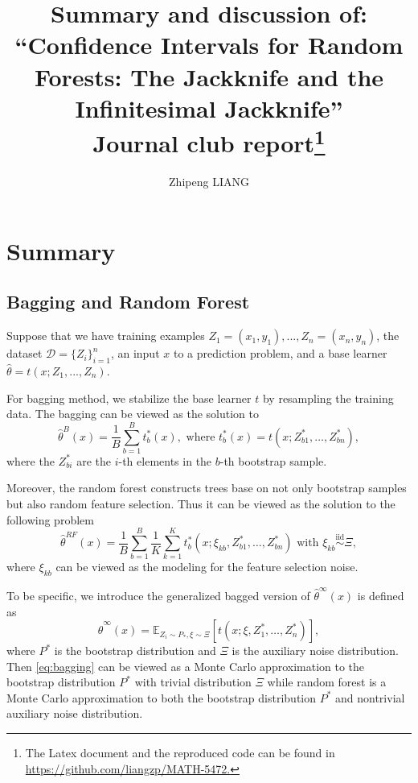 \documentclass[11pt]{article}
\title{Summary and discussion of: ``Confidence Intervals for Random Forests: The Jackknife and the Infinitesimal Jackknife'' \\
{\large Journal club report}\footnote{The Latex document and the reproduced code can be found in \href{https://github.com/liangzp/MATH-5472}{https://github.com/liangzp/MATH-5472.}}}
\author{Zhipeng LIANG}
\date{}
\begin{document}
\maketitle
\tableofcontents
\section{Summary}
\subsection{Bagging and Random Forest}
Suppose that we have training examples $Z_1 = (x_1, y_1), ..., Z_n = (x_n, y_n)$, the dataset $\mathcal{D}=\{Z_i\}_{i=1}^n$, an input $x$ to a prediction problem, and a base learner $\hat{\theta} = t(x;Z_1, ..., Z_n)$.

For bagging method, we stabilize the base learner $t$ by resampling the training data. 
The bagging can be viewed as the solution to 
\begin{equation}
	\label{eq:bagging}
	\hat{\theta}^{B}(x)=\frac{1}{B} \sum_{b=1}^{B} t_{b}^{*}(x), \text { where } t_{b}^{*}(x)=t\left(x ; Z_{b 1}^{*}, \ldots, Z_{b n}^{*}\right),
\end{equation}
where the $Z^{*}_{bi}$ are the $i$-th elements in the $b$-th bootstrap sample.

Moreover, the random forest constructs trees base on not only bootstrap samples but also random feature selection.
Thus it can be viewed as the solution to the following problem 
\begin{equation}
	\label{eq:random-forest}
	\hat{\theta}^{R F}(x)=\frac{1}{B} \sum_{b=1}^{B} \frac{1}{K} \sum_{k=1}^{K} t_{b}^{*}\left(x ; \xi_{k b}, Z_{b 1}^{*}, \ldots, Z_{b n}^{*}\right) \text{ with } \xi_{k b} \stackrel{\mathrm{iid}}{\sim} \Xi,
\end{equation}
where $\xi_{kb}$ can be viewed as the modeling for the feature selection noise.


To be specific, we introduce the generalized bagged version of $\hat{\theta}^{\infty}(x)$ is defined as 
\begin{equation}
	\label{eq:bagged-version}
	\hat{\theta}^{\infty}(x)=\mathbb{E}_{Z_i\sim P_{*}, \xi \sim \Xi}\left[t\left(x; \xi, Z_{1}^{*}, \ldots, Z_{n}^{*}\right)\right],
\end{equation}
where $P^{*}$ is the bootstrap distribution and $\Xi$ is the auxiliary noise distribution. 
Then \eqref{eq:bagging} can be viewed as a Monte Carlo approximation to the bootstrap distribution $P^{*}$ with trivial distribution $\Xi$ while random forest is a Monte Carlo approximation to both the bootstrap distribution $P^{*}$ and nontrivial auxiliary noise distribution.
\end{document}
